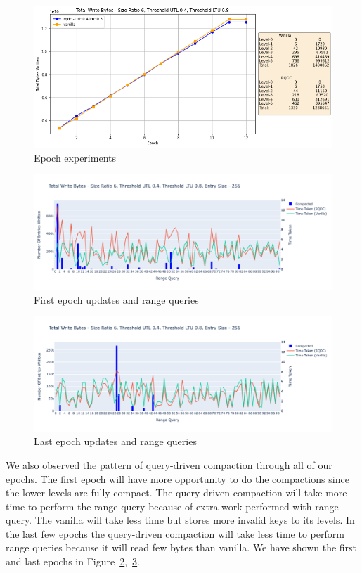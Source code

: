 \begin{figure}
    \includegraphics[scale=0.55]{Figures/epoch_experiments.png}
    \caption{Epoch experiments}\label{fig:epoch_experiments}
\end{figure}

\begin{figure}
    \includegraphics[scale=0.52]{Figures/first_epoch.png}
    \caption{First epoch updates and range queries}\label{fig:first_epoch}
\end{figure}

\begin{figure}
    \includegraphics[scale=0.42]{Figures/last_epoch.png}
    \caption{Last epoch updates and range queries}\label{fig:last_epoch}
\end{figure}

We also observed the pattern of query-driven compaction through all of our epochs. The first epoch will have more 
opportunity to do the compactions since the lower levels are fully compact. The query driven compaction will take more 
time to perform the range query because of extra work performed with range query. The vanilla will take less time but 
stores more invalid keys to its levels. In the last few epochs the query-driven compaction will take less time to 
perform range queries because it will read few bytes than vanilla. We have shown the first and last epochs in 
Figure~\ref{fig:first_epoch},\ \ref{fig:last_epoch}.

